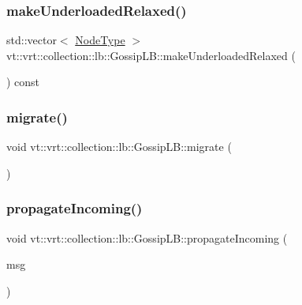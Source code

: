 \subsubsection{\texorpdfstring{make\+Underloaded\+Relaxed()}{makeUnderloadedRelaxed()}}
{\footnotesize\ttfamily std\+::vector$<$ \hyperlink{namespacevt_a866da9d0efc19c0a1ce79e9e492f47e2}{Node\+Type} $>$ vt\+::vrt\+::collection\+::lb\+::\+Gossip\+L\+B\+::make\+Underloaded\+Relaxed (\begin{DoxyParamCaption}{ }\end{DoxyParamCaption}) const\hspace{0.3cm}{\ttfamily [protected]}}

\mbox{\label{structvt_1_1vrt_1_1collection_1_1lb_1_1_gossip_l_b_ab4ea54ee62ebad9105d79ece61f41b50}} 
\subsubsection{\texorpdfstring{migrate()}{migrate()}}
{\footnotesize\ttfamily void vt\+::vrt\+::collection\+::lb\+::\+Gossip\+L\+B\+::migrate (\begin{DoxyParamCaption}{ }\end{DoxyParamCaption})\hspace{0.3cm}{\ttfamily [protected]}}

\mbox{\label{structvt_1_1vrt_1_1collection_1_1lb_1_1_gossip_l_b_afb935632c8af4efabc3d9a9aa8a5105d}} 
\subsubsection{\texorpdfstring{propagate\+Incoming()}{propagateIncoming()}}
{\footnotesize\ttfamily void vt\+::vrt\+::collection\+::lb\+::\+Gossip\+L\+B\+::propagate\+Incoming (\begin{DoxyParamCaption}\item[{\hyperlink{structvt_1_1vrt_1_1collection_1_1lb_1_1_gossip_l_b_af7170ae946da8af68105109f04824f03}{Gossip\+Msg} $\ast$}]{msg }\end{DoxyParamCaption})\hspace{0.3cm}{\ttfamily [protected]}}

